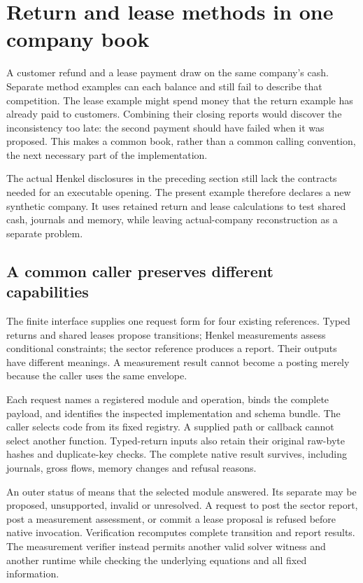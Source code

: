 \section{Return and lease methods in one company book}
\label{sec:shared-return-lease-book}

A customer refund and a lease payment draw on the same company's cash. Separate
method examples can each balance and still fail to describe that competition.
The lease example might spend money that the return example has already paid
to customers. Combining their closing reports would discover the inconsistency
too late: the second payment should have failed when it was proposed.
This makes a common book, rather than a common calling convention, the next
necessary part of the implementation.

The actual Henkel disclosures in the preceding section still lack the contracts
needed for an executable opening. The present example therefore declares a
new synthetic company. It uses retained return and lease calculations to test
shared cash, journals and memory, while leaving actual-company reconstruction
as a separate problem.

\subsection{A common caller preserves different capabilities}

The finite  interface supplies one request form for
four existing references. Typed returns and shared leases propose transitions;
Henkel measurements assess conditional constraints; the sector reference
produces a report. Their outputs have different meanings. A measurement result
cannot become a posting merely because the caller uses the same envelope.

Each request names a registered module and operation, binds the complete
payload, and identifies the inspected implementation and schema bundle.
The caller selects code from its fixed registry. A supplied path or callback
cannot select another function. Typed-return inputs also retain their original
raw-byte hashes and duplicate-key checks. The complete native result survives,
including journals, gross flows, memory changes and refusal reasons.

An outer status of  means that the selected module answered.
Its separate  may be proposed, unsupported, invalid or
unresolved. A request to post the sector report, post a measurement assessment,
or commit a lease proposal is refused before native invocation. Verification
recomputes complete transition and report results. The measurement verifier
instead permits another valid solver witness and another runtime while checking
the underlying equations and all fixed information.

